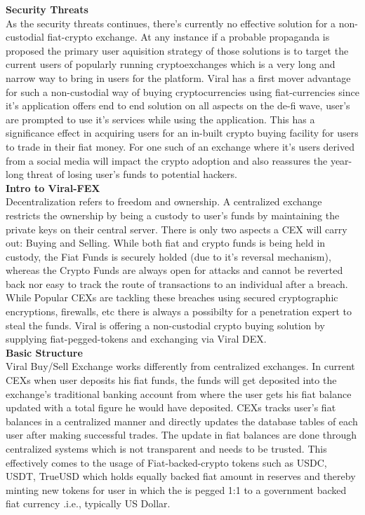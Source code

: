 \documentclass[conference]{IEEEtran}
\begin{document}
\textbf{Security Threats}\\

As the security threats continues, there's currently no effective solution for a non-custodial fiat-crypto exchange. At any instance if a probable propaganda is proposed the primary user aquisition strategy of those solutions is to target the current users of popularly running cryptoexchanges which is a very long and narrow way to bring in users for the platform. Viral has a first mover advantage for such a non-custodial way of buying cryptocurrencies using fiat-currencies since it's application offers end to end solution on all aspects on the de-fi wave, user's are prompted to use it's services while using the application. This has a significance effect in acquiring users for an in-built crypto buying facility for users to trade in their fiat money. For one such of an exchange where it's users derived from a social media will impact the crypto adoption and also reassures the year-long threat of losing user's funds to potential hackers.\\

\textbf{Intro to Viral-FEX}\\

Decentralization refers to freedom and ownership. A centralized exchange restricts the ownership by being a custody to user's funds by maintaining the private keys on their central server. There is only two aspects a CEX will carry out: Buying and Selling. While both fiat and crypto funds is being held in custody, the Fiat Funds is securely holded (due to it's reversal mechanism), whereas the Crypto Funds are always open for attacks and cannot be reverted back nor easy to track the route of transactions to an individual after a breach. While Popular CEXs are tackling these breaches using secured cryptographic encryptions, firewalls, etc there is always a possibilty for a penetration expert to steal the funds. Viral is offering a non-custodial crypto buying solution by supplying fiat-pegged-tokens and exchanging via Viral DEX.\\

\textbf{Basic Structure}\\

Viral Buy/Sell Exchange works differently from centralized exchanges. In current CEXs when user deposits his fiat funds, the funds will get deposited into the exchange's traditional banking account from where the user gets his fiat balance updated with a total figure he would have deposited. CEXs tracks user's fiat balances in a centralized manner and directly updates the database tables of each user after making successful trades. The update in fiat balances are done through centralized systems which is not transparent and needs to be trusted. This effectively comes to the usage of Fiat-backed-crypto tokens such as USDC, USDT, TrueUSD which holds equally backed fiat amount in reserves and thereby minting new tokens for user in which the is pegged 1:1 to a government backed fiat currency .i.e., typically US Dollar.\\
\end{document}
